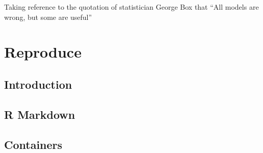 \documentclass[
]{book}
\begin{document}
Taking reference to the quotation of statistician George Box that ``All models are wrong, but some are useful''

\hypertarget{part-reproduce}{%
\part{Reproduce}\label{part-reproduce}}

\hypertarget{reproduce}{%
\chapter{Introduction}\label{reproduce}}

\hypertarget{r-markdown}{%
\chapter{R Markdown}\label{r-markdown}}

\hypertarget{containers}{%
\chapter{Containers}\label{containers}}

  
\end{document}
